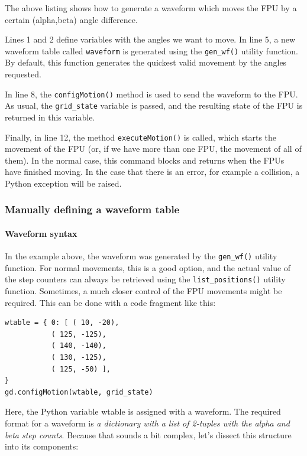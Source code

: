 \documentclass{scrartcl}[12pt,a4paper]
\begin{document}
The above listing shows how to generate a waveform which moves the FPU
by a certain (alpha,beta) angle difference.

Lines 1 and 2 define variables with the angles we want to move. In
line 5, a new waveform table called \texttt{waveform} is generated
using the \texttt{gen\_wf()} utility function.  By default, this
function generates the quickest valid movement by the angles
requested.

In line 8, the \texttt{configMotion()} method is used to send the
waveform to the FPU. As usual, the \texttt{grid\_state} variable is
passed, and the resulting state of the FPU is returned in this
variable.

Finally, in line 12, the method \texttt{executeMotion()} is called,
which starts the movement of the FPU (or, if we have more than one
FPU, the movement of all of them). In the normal case, this command
blocks and returns when the FPUs have finished moving.  In the case
that there is an error, for example a collision, a Python exception
will be raised.



\subsubsection{Manually defining a waveform table}

\paragraph{Waveform syntax}

In the example above, the waveform was generated by the
\texttt{gen\_wf()} utility function.  For normal movements, this is a
good option, and the actual value of the step counters can always be
retrieved using the \texttt{list\_positions()} utility
function. Sometimes, a much closer control of the FPU movements might
be required. This can be done with a code fragment like this:

\begin{verbatim}
wtable = { 0: [ ( 10, -20),
           ( 125, -125),
           ( 140, -140),
           ( 130, -125),
           ( 125, -50) ],
}
gd.configMotion(wtable, grid_state)
\end{verbatim}

Here, the Python variable wtable is assigned with
a waveform. The required format for a waveform
is \emph{a dictionary with a list of 2-tuples
  with the alpha and beta step counts}. Because
that sounds a bit complex, let's dissect this
structure into its components:
\end{document}
